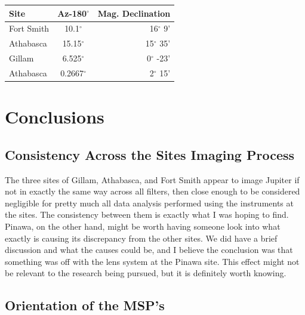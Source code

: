 \documentclass[11pt]{article}
\begin{document}
\begin{center}
\begin{tabular}{| l | c | r| }
\hline
  Site & Az-180$^\circ$ & Mag. Declination \\ \hline
  Fort Smith & 10.1$^\circ$ & 16$^\circ$ 9' \\
  Athabasca & 15.15$^\circ$ & 15$^\circ$ 35' \\
  Gillam & 6.525$^\circ$ & 0$^\circ$ -23' \\
  Athabasca & 0.2667$^\circ$ & 2$^\circ$ 15' \\ \hline
\end{tabular}
\end{center}


\section{Conclusions}
\subsection{Consistency Across the Sites Imaging Process}
\hspace{0.5cm}

The three sites of Gillam, Athabasca, and Fort Smith appear to image Jupiter if not in exactly the same way across all filters, then close enough to be considered negligible for pretty much all data analysis performed using the instruments at the sites. The consistency between them is exactly what I was hoping to find. Pinawa, on the other hand, might be worth having someone look into what exactly is causing its discrepancy from the other sites. We did have a brief discussion and what the causes could be, and I believe the conclusion was that something was off with the lens system at the Pinawa site. This effect might not be relevant to the research being pursued, but it is definitely worth knowing.


\subsection{Orientation of the MSP's}

\hspace{0.5cm}
\end{document}
